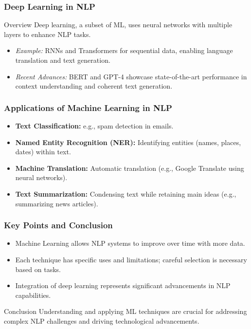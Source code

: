 \documentclass[aspectratio=169]{beamer}
\begin{document}
\begin{frame}[fragile]
    \frametitle{Deep Learning in NLP}
    \begin{block}{Overview}
        Deep learning, a subset of ML, uses neural networks with multiple layers to enhance NLP tasks.
    \end{block}
    \begin{itemize}
        \item \textit{Example:} RNNs and Transformers for sequential data, enabling language translation and text generation.
        \item \textit{Recent Advances:} BERT and GPT-4 showcase state-of-the-art performance in context understanding and coherent text generation.
    \end{itemize}
\end{frame}

\begin{frame}[fragile]
    \frametitle{Applications of Machine Learning in NLP}
    \begin{itemize}
        \item \textbf{Text Classification:} e.g., spam detection in emails.
        \item \textbf{Named Entity Recognition (NER):} Identifying entities (names, places, dates) within text.
        \item \textbf{Machine Translation:} Automatic translation (e.g., Google Translate using neural networks).
        \item \textbf{Text Summarization:} Condensing text while retaining main ideas (e.g., summarizing news articles).
    \end{itemize}
\end{frame}

\begin{frame}[fragile]
    \frametitle{Key Points and Conclusion}
    \begin{itemize}
        \item Machine Learning allows NLP systems to improve over time with more data.
        \item Each technique has specific uses and limitations; careful selection is necessary based on tasks.
        \item Integration of deep learning represents significant advancements in NLP capabilities.
    \end{itemize}
    \begin{block}{Conclusion}
        Understanding and applying ML techniques are crucial for addressing complex NLP challenges and driving technological advancements.
    \end{block}
\end{frame}
\end{document}
